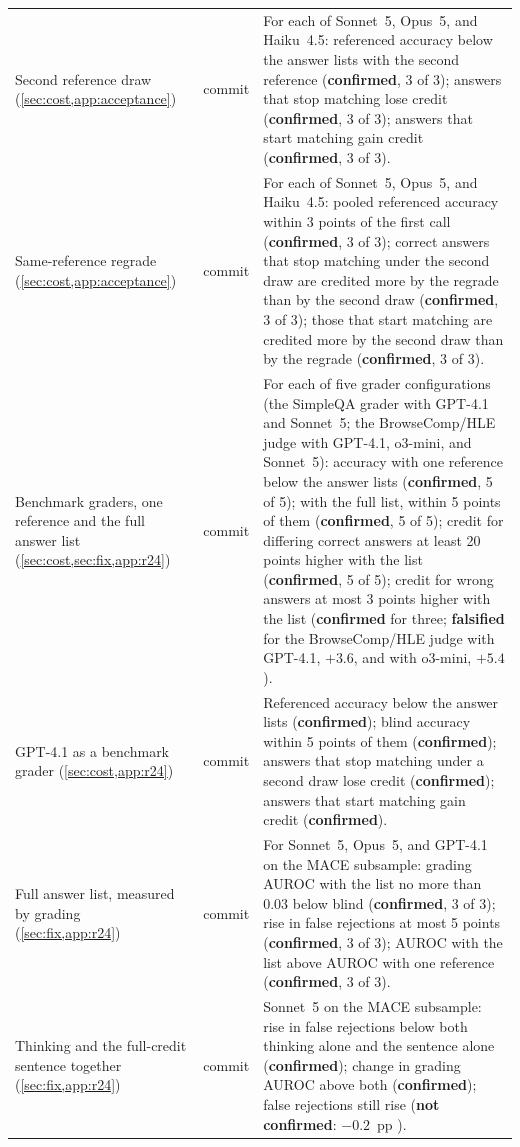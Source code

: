 {\begin{longtable}{L{3.2cm}L{1.1cm}L{8.7cm}}
Second reference draw (\cref{sec:cost,app:acceptance}) & commit & For each of Sonnet~5, Opus~5, and Haiku~4.5: referenced accuracy below the answer lists with the second reference (\textbf{confirmed}, 3 of 3); answers that stop matching lose credit (\textbf{confirmed}, 3 of 3); answers that start matching gain credit (\textbf{confirmed}, 3 of 3). \\
Same-reference regrade (\cref{sec:cost,app:acceptance}) & commit & For each of Sonnet~5, Opus~5, and Haiku~4.5: pooled referenced accuracy within 3 points of the first call (\textbf{confirmed}, 3 of 3); correct answers that stop matching under the second draw are credited more by the regrade than by the second draw (\textbf{confirmed}, 3 of 3); those that start matching are credited more by the second draw than by the regrade (\textbf{confirmed}, 3 of 3). \\
Benchmark graders, one reference and the full answer list (\cref{sec:cost,sec:fix,app:r24}) & commit & For each of five grader configurations (the SimpleQA grader with GPT-4.1 and Sonnet~5; the BrowseComp/HLE judge with GPT-4.1, o3-mini, and Sonnet~5): accuracy with one reference below the answer lists (\textbf{confirmed}, 5 of 5); with the full list, within 5 points of them (\textbf{confirmed}, 5 of 5); credit for differing correct answers at least 20 points higher with the list (\textbf{confirmed}, 5 of 5); credit for wrong answers at most 3 points higher with the list (\textbf{confirmed} for three; \textbf{falsified} for the BrowseComp/HLE judge with GPT-4.1, $+3.6$, and with o3-mini, $+5.4$). \\
GPT-4.1 as a benchmark grader (\cref{sec:cost,app:r24}) & commit & Referenced accuracy below the answer lists (\textbf{confirmed}); blind accuracy within 5 points of them (\textbf{confirmed}); answers that stop matching under a second draw lose credit (\textbf{confirmed}); answers that start matching gain credit (\textbf{confirmed}). \\
Full answer list, measured by grading (\cref{sec:fix,app:r24}) & commit & For Sonnet~5, Opus~5, and GPT-4.1 on the \textsc{MACE} subsample: grading AUROC with the list no more than 0.03 below blind (\textbf{confirmed}, 3 of 3); rise in false rejections at most 5 points (\textbf{confirmed}, 3 of 3); AUROC with the list above AUROC with one reference (\textbf{confirmed}, 3 of 3). \\
Thinking and the full-credit sentence together (\cref{sec:fix,app:r24}) & commit & Sonnet~5 on the \textsc{MACE} subsample: rise in false rejections below both thinking alone and the sentence alone (\textbf{confirmed}); change in grading AUROC above both (\textbf{confirmed}); false rejections still rise (\textbf{not confirmed}: $-0.2$~pp ). \\

\end{longtable}}
